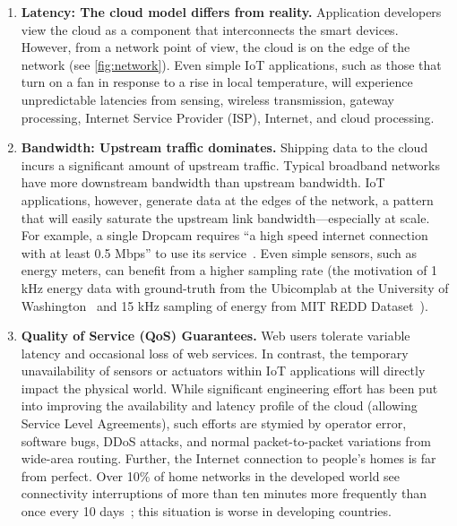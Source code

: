 \begin{enumerate}
\item \textbf{Latency: The cloud model differs from reality.}  Application
  developers view the cloud as a component that interconnects the smart devices.
  However, from a network point of view, the cloud is on the edge of the network
  (see \autoref{fig:network}).  Even simple IoT applications, such as those that
  turn on a fan in response to a rise in local temperature, will experience
  unpredictable latencies from sensing, wireless transmission, gateway
  processing, Internet Service Provider (ISP), Internet, and cloud processing.


\item \textbf{Bandwidth: Upstream traffic dominates.}  Shipping data to the
  cloud incurs a significant amount of upstream traffic.  Typical broadband
  networks have more downstream bandwidth than upstream bandwidth.  IoT
  applications, however, generate data at the edges of the network, a pattern
  that will easily saturate the upstream link bandwidth---especially at scale.
  For example, a single Dropcam requires ``a high speed internet connection with
  at least 0.5 Mbps'' to use its service~\cite{dropcam}.  Even simple sensors,
  such as energy meters, can benefit from a higher sampling rate (the motivation
  of 1 kHz energy data with ground-truth from the Ubicomplab at the University
  of Washington~\cite{gupta2015household} and 15 kHz sampling of energy from MIT
  REDD Dataset~\cite{kolter2011redd}).

\item \textbf{Quality of Service (QoS) Guarantees.} Web users tolerate
  variable latency and occasional loss of web services.  In contrast, the
  temporary unavailability of sensors or actuators within IoT applications will
  directly impact the physical world.  While significant engineering effort has
  been put into improving the availability and latency profile of the cloud
  (allowing Service Level Agreements), such efforts are stymied by operator
  error, software bugs, DDoS attacks, and normal packet-to-packet variations
  from wide-area routing. Further, the Internet connection to people's homes is
  far from perfect.  Over 10\% of home networks in the developed world see
  connectivity interruptions of more than ten minutes more frequently than once
  every 10 days~\cite{grover2013peeking}; this situation is worse in developing
  countries.


\end{enumerate}

